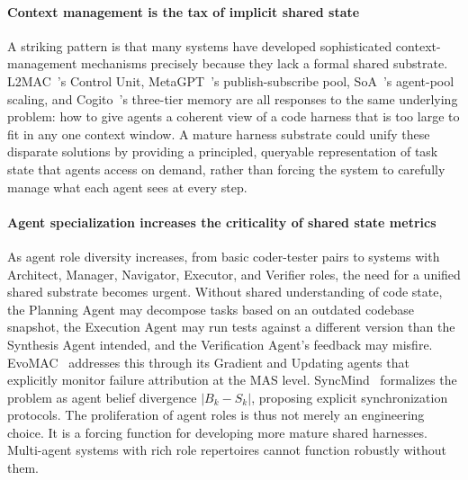 \paragraph{Context management is the tax of implicit shared state}
A striking pattern is that many systems have
developed sophisticated context-management mechanisms precisely
because they lack a formal shared substrate.
L2MAC~\cite{Holt2023L2MAC}'s Control Unit,
MetaGPT~\cite{Hong2023MetaGPT}'s publish-subscribe pool,
SoA~\cite{Ishibashi2024SelfOrganized}'s agent-pool scaling, and
Cogito~\cite{Li2025Cogito}'s three-tier memory are all responses
to the same underlying problem: how to give agents a coherent
view of a code harness that is too large to fit in any one
context window. A mature harness substrate could unify these
disparate solutions by providing a principled, queryable
representation of task state that agents access on demand,
rather than forcing the system to carefully manage what each
agent sees at every step.

\paragraph{Agent specialization increases the criticality of shared state metrics}
As agent role diversity increases, from basic coder-tester pairs
to systems with Architect, Manager, Navigator, Executor, and
Verifier roles, the need for a unified shared substrate becomes
urgent. Without shared understanding of code state, the Planning
Agent may decompose tasks based on an outdated codebase snapshot,
the Execution Agent may run tests against a different version
than the Synthesis Agent intended, and the Verification Agent's
feedback may misfire. EvoMAC~\cite{Hu2025EvoMAC} addresses this
through its Gradient and Updating agents that explicitly monitor
failure attribution at the MAS level.
SyncMind~\cite{Guo2025SyncMind} formalizes the problem as agent
belief divergence $|B_k - S_k|$, proposing explicit
synchronization protocols. The proliferation of agent roles is
thus not merely an engineering choice. It is a forcing function
for developing more mature shared harnesses. Multi-agent systems
with rich role repertoires cannot function robustly without them.
